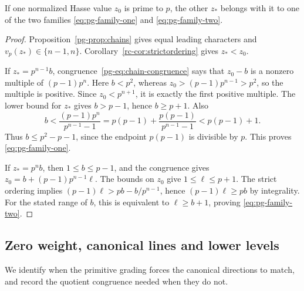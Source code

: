 \begin{proposition}\label{pg-prop:prime-families}
If one normalized Hasse value $z_0$ is prime to $p$, the other $z_*$ belongs with it to one of the two families \eqref{eq:pg-family-one} and \eqref{eq:pg-family-two}.
\end{proposition}
\begin{proof}
Proposition~\ref{pg-prop:chains} gives equal leading characters and $v_p(z_*)\in\{n-1,n\}$. Corollary~\ref{rc-cor:strictordering} gives $z_*<z_0$.

If $z_*=p^{n-1}b$, congruence~\eqref{pg-eq:chain-congruence} says that $z_0-b$ is a nonzero multiple of $(p-1)p^n$. Here $b<p^2$, whereas $z_0>(p-1)p^{n-1}>p^2$, so the multiple is positive. Since $z_0<p^{n+1}$, it is exactly the first positive multiple. The lower bound for $z_*$ gives $b>p-1$, hence $b\ge p+1$. Also
\[
 b<\frac{(p-1)p^n}{p^{n-1}-1}
 =p(p-1)+\frac{p(p-1)}{p^{n-1}-1}<p(p-1)+1.
\]
Thus $b\le p^2-p-1$, since the endpoint $p(p-1)$ is divisible by $p$. This proves \eqref{eq:pg-family-one}.

If $z_*=p^n b$, then $1\le b\le p-1$, and the congruence gives $z_0=b+(p-1)p^{n-1}\ell$. The bounds on $z_0$ give $1\le\ell\le p+1$. The strict ordering implies $(p-1)\ell>pb-b/p^{n-1}$, hence $(p-1)\ell\ge pb$ by integrality. For the stated range of $b$, this is equivalent to $\ell\ge b+1$, proving \eqref{eq:pg-family-two}.
\end{proof}

\subsection{Zero weight, canonical lines and lower levels}
We identify when the primitive grading forces the canonical directions to match, and record the quotient congruence needed when they do not.

